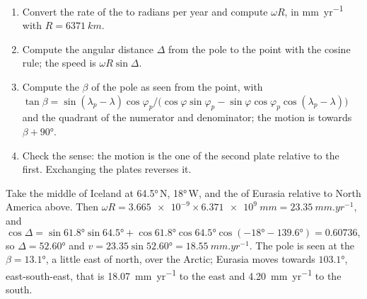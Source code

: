 \begin{method}\label{met:b1:plate-kinematics:velocity}
\begin{enumerate}
  \item Convert the rate of the  to radians per year and compute
        $\omega R$, in \unit{mm.yr^{-1}} with $R = \qty{6371}{km}$.
  \item Compute the angular distance $\Delta$ from the pole to the point with
        the cosine rule; the speed is $\omega R\sin\Delta$.
  \item Compute the  $\beta$ of the pole as seen from the point, with
        $\tan\beta = \sin(\lambda_p - \lambda)\cos\varphi_p /
        \bigl(\cos\varphi\sin\varphi_p - \sin\varphi\cos\varphi_p
        \cos(\lambda_p - \lambda)\bigr)$ and the quadrant of the numerator and
        denominator; the motion is towards $\beta + \ang{90}$.
  \item Check the sense: the motion is the one of the second plate relative to
        the first. Exchanging the plates reverses it.
\end{enumerate}
\end{method}

\begin{example}\label{ex:b1:plate-kinematics:iceland}
Take the middle of Iceland at \ang{64.5}\,N, \ang{18}\,W, and the 
of Eurasia relative to North America above. Then $\omega R =
\num{3.665e-9}\times\qty{6.371e9}{mm} = \qty{23.35}{mm.yr^{-1}}$, and
\[
  \cos\Delta = \sin\ang{61.8}\sin\ang{64.5}
  + \cos\ang{61.8}\cos\ang{64.5}\cos(\ang{-18} - \ang{139.6}) = 0.60736,
\]
so $\Delta = \ang{52.60}$ and $v = 23.35\sin\ang{52.60} = \qty{18.55}{mm.yr^{-1}}$.
The pole is seen at the  $\beta = \ang{13.1}$, a little east of north,
over the Arctic; Eurasia moves towards $\ang{103.1}$, east-south-east, that is
\qty{18.07}{mm.yr^{-1}} to the east and \qty{4.20}{mm.yr^{-1}} to the south.
\end{example}


